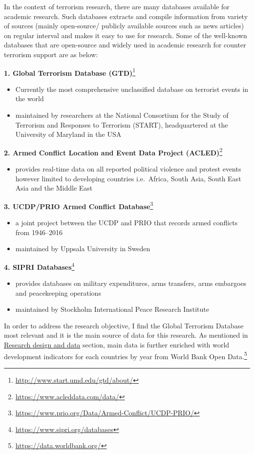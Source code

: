 \documentclass[11pt,oneside,a4paper]{reedthesis}
\providecommand{\tightlist}{%
  \setlength{\itemsep}{0pt}\setlength{\parskip}{0pt}}
\begin{document}
In the context of terrorism research, there are many databases available
for academic research. Such databases extracts and compile information
from variety of sources (mainly open-source/ publicly available sources
such as news articles) on regular interval and makes it easy to use for
research. Some of the well-known databases that are open-source and
widely used in academic research for counter terrorism support are as
below:

\textbf{1. Global Terrorism Database (GTD)}\footnote{\url{http://www.start.umd.edu/gtd/about/}}
\begin{itemize}
\tightlist
\item
  Currently the most comprehensive unclassified database on terrorist
  events in the world
\item
  maintained by researchers at the National Consortium for the Study of
  Terrorism and Responses to Terrorism (START), headquartered at the
  University of Maryland in the USA
\end{itemize}
\textbf{2. Armed Conflict Location and Event Data Project
(ACLED)}\footnote{\url{https://www.acleddata.com/data/}}
\begin{itemize}
\tightlist
\item
  provides real-time data on all reported political violence and protest
  events however limited to developing countries i.e.~Africa, South
  Asia, South East Asia and the Middle East
\end{itemize}
\textbf{3. UCDP/PRIO Armed Conflict Database}\footnote{\url{https://www.prio.org/Data/Armed-Conflict/UCDP-PRIO/}}
\begin{itemize}
\tightlist
\item
  a joint project between the UCDP and PRIO that records armed conflicts
  from 1946--2016
\item
  maintained by Uppsala University in Sweden
\end{itemize}
\textbf{4. SIPRI Databases}\footnote{\url{https://www.sipri.org/databases}}
\begin{itemize}
\tightlist
\item
  provides databases on military expenditures, arms transfers, arms
  embargoes and peacekeeping operations
\item
  maintained by Stockholm International Peace Research Institute
\end{itemize}
In order to address the research objective, I find the Global Terrorism
Database most relevant and it is the main source of data for this
research. As mentioned in
\protect\hyperlink{research-design-and-data}{Research design and data}
section, main data is further enriched with world development indicators
for each countries by year from World Bank Open Data.\footnote{\url{https://data.worldbank.org/}}
\end{document}
